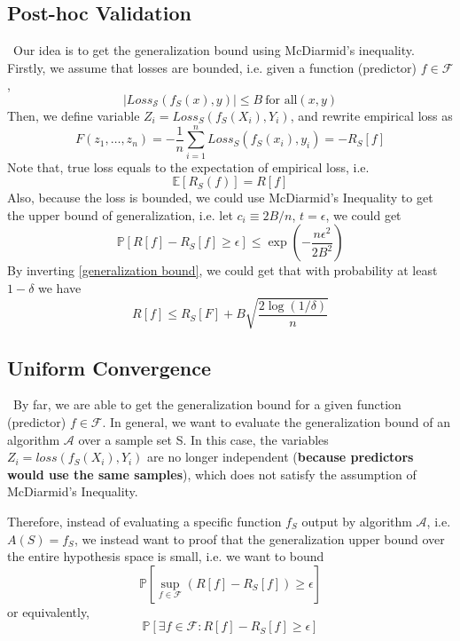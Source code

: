 \documentclass{article}[12pt]
\begin{document}
\subsection{Post-hoc Validation}
\
\indent Our idea is to get the generalization bound using McDiarmid's inequality. Firstly, we assume that losses are bounded, i.e. given a function (predictor) $f \in \mathcal{F}$,
\begin{equation*}
    |Loss_{\mathcal{S}}(f_S(x),y)| \leq B \  \text{for all} (x,y) 
\end{equation*}
Then, we define variable $Z_i = Loss_S(f_S(X_i),Y_i)$, and rewrite empirical loss as 
\begin{equation*}
    F(z_1,\ldots,z_n) = -\frac{1}{n}\sum_{i=1}^n Loss_S(f_S(x_i),y_i) = -R_S{[f]}
\end{equation*}Note that, true loss equals to the expectation of empirical loss, i.e.
\begin{equation*}
    \mathbb{E}[R_S(f)] = R[f]
\end{equation*}
Also, because the loss is bounded, we could use McDiarmid's Inequality to get the upper bound of generalization, i.e. let $c_i \equiv 2B/n$, $t = \epsilon$, we could get 
\begin{equation}
    \mathbb{P}[R[f]-R_S[f]\geq \epsilon] \leq \exp{(-\frac{n\epsilon^2}{2B^2})}
    \label{generalization bound}
\end{equation}By inverting \ref{generalization bound}, we could get that with probability at least $1-\delta$ we have 
\begin{equation}
    R[f] \leq R_S[F] + B\sqrt{\frac{2\log(1/\delta)}{n}}
\end{equation}

\subsection{Uniform Convergence}
\
\indent By far, we are able to get the generalization bound for a given function (predictor) $f \in \mathcal{F}$. In general, we want to evaluate the generalization bound of an algorithm $\mathcal{A}$ over a sample set S. In this case, the variables $Z_i=loss(f_S(X_i),Y_i)$ are no longer independent (\textbf{because predictors would use the same samples}), which does not satisfy the assumption of McDiarmid's Inequality.

Therefore, instead of evaluating a specific function $f_S$ output by algorithm $\mathcal{A}$, i.e. $A(S)=f_S$, we instead want to proof that the  generalization upper bound over the entire hypothesis space is small, i.e. we want to bound 
\begin{equation*}
    \mathbb{P}[\sup_{f \in \mathcal{F}}(R[f]-R_S[f]) \geq \epsilon]
\end{equation*}
or equivalently,
\begin{equation*}
    \mathbb{P}[\exists f \in \mathcal{F} : R[f] - R_S[f] \geq \epsilon] 
\end{equation*}
\end{document}
